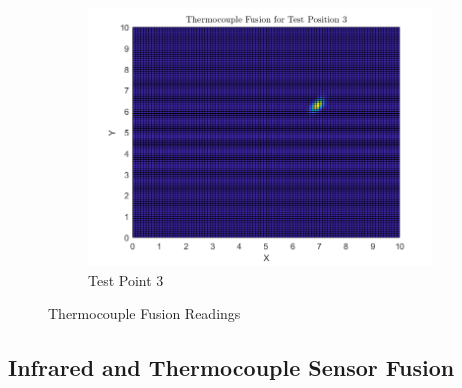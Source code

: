 \documentclass[12pt]{article}
\begin{document}
\begin{figure}[H]
\begin{subfigure}[h]{0.45\textwidth}
        \includegraphics[width=\textwidth]{images/ThermocoupleFusionA3.png}
        \caption{Test Point 3}
        \label{fig:TC-Fus-3}
    \end{subfigure}
    \caption{Thermocouple Fusion Readings}
    \label{fig:TC-Fus}
\end{figure}

\subsection{Infrared and Thermocouple Sensor Fusion}
\end{document}
